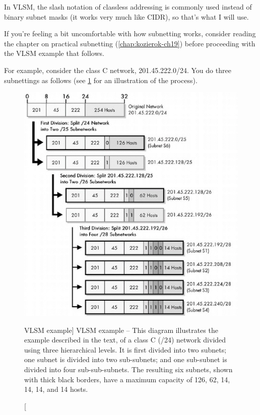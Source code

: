 In VLSM, the slash notation of classless addressing is commonly used instead of binary subnet masks (it works very much like CIDR), so that's what I will use.

\begin{note}
If you're feeling a bit uncomfortable with how subnetting works, consider reading the chapter on practical subnetting
(\cref{chap:kozierok-ch19}) before proceeding with the VLSM example that follows.
\end{note}

For example, consider the class C network, 201.45.222.0/24.
You do three subnettings as follows (see \cref{fig:vlsm-example} for an illustration of the process).


\begin{figure}
   \centering
   \includegraphics[width=.9\textwidth]{images/vlsm-example.jpg}
   \caption
      [VLSM example]
      {VLSM example -- 
      This diagram illustrates the example described in the text, of a class C (/24) network divided using three hierarchical levels.
      It is first divided into two subnets; one subnet is divided into two sub-subnets; and one sub-subnet is divided into four sub-sub-subnets.
      The resulting six subnets, shown with thick black borders, have a maximum capacity of 126, 62, 14, 14, 14, and 14 hosts.}
   \label{fig:vlsm-example}
\end{figure}


